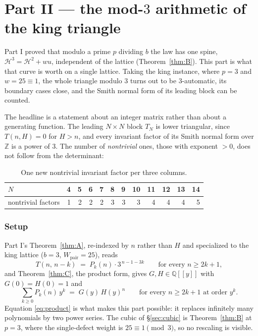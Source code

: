 \documentclass[11pt]{article}
\newcommand{\Wp}{W_{\mathrm{pair}}}
\newcommand{\Z}{\mathbb{Z}}
\newcommand{\Q}{\mathbb{Q}}
\begin{document}
\part*{Part II --- the mod-$3$ arithmetic of the king triangle}

Part I proved that modulo a prime $p$ dividing $b$ the law has one spine,
$\mathcal H^3 = \mathcal H^2 + wu$, independent of the lattice
(Theorem~\ref{thm:B}). This part is what that curve is worth on a single
lattice. Taking the king instance, where $p = 3$ and $w = 25 \equiv 1$, the
whole triangle modulo $3$ turns out to be $3$-automatic, its boundary cases
close, and the Smith normal form of its leading block can be counted.

The headline is a statement about an integer matrix rather than about a
generating function. The leading $N \times N$ block $T_N$ is lower triangular,
since $T(n,H) = 0$ for $H > n$, and every invariant factor of its Smith normal
form over $\Z$ is a power of $3$. The number of \emph{nontrivial} ones, those
with exponent $> 0$, does not follow from the determinant:

\begin{table}[H]
\centering\small
\begin{tabular}{l r r r r r r r r r r r}
\toprule
$N$ & 4 & 5 & 6 & 7 & 8 & 9 & 10 & 11 & 12 & 13 & 14 \\
\midrule
nontrivial factors & 1 & 2 & 2 & 2 & 3 & 3 & 3 & 4 & 4 & 4 & 5 \\
\bottomrule
\end{tabular}
\caption{One new nontrivial invariant factor per three columns.}
\label{tab:snfcount}
\end{table}

\section{Setup}
\label{sec:setup}

Part I's Theorem~\ref{thm:A}, re-indexed by $n$ rather than $H$ and
specialized to the king lattice ($b = 3$, $\Wp = 25$), reads
\begin{equation}
  T(n,\,n-k) \;=\; P_k(n)\cdot 3^{\,n-1-3k}
  \qquad\text{for every } n \ge 2k+1,
  \label{eq:law}
\end{equation}
and Theorem~\ref{thm:C}, the product form, gives $G, H \in \Q[[y]]$ with
$G(0) = H(0) = 1$ and
\begin{equation}
  \sum_{k \ge 0} P_k(n)\,y^k \;=\; G(y)\,H(y)^n
  \qquad\text{for every } n \ge 2k+1 \text{ at order } y^k .
  \label{eq:product}
\end{equation}
Equation \eqref{eq:product} is what makes this part possible: it replaces
infinitely many polynomials by two power series. The cubic of
\S\ref{sec:cubic} is Theorem~\ref{thm:B} at $p = 3$, where the single-defect
weight is $25 \equiv 1 \pmod 3$, so no rescaling is visible.
\end{document}
